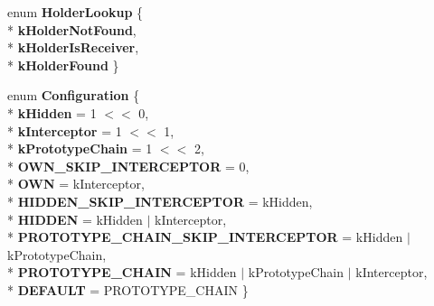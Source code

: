 \begin{DoxyCompactItemize}
\item 
enum {\bfseries Holder\+Lookup} \{ \\*
{\bfseries k\+Holder\+Not\+Found}, 
\\*
{\bfseries k\+Holder\+Is\+Receiver}, 
\\*
{\bfseries k\+Holder\+Found}
 \}\hypertarget{classv8_1_1internal_1_1_b_a_s_e___e_m_b_e_d_d_e_d_a574780580d55298af45d52077d3422fe}{}\label{classv8_1_1internal_1_1_b_a_s_e___e_m_b_e_d_d_e_d_a574780580d55298af45d52077d3422fe}

\item 
enum {\bfseries Configuration} \{ \\*
{\bfseries k\+Hidden} = 1 $<$$<$ 0, 
\\*
{\bfseries k\+Interceptor} = 1 $<$$<$ 1, 
\\*
{\bfseries k\+Prototype\+Chain} = 1 $<$$<$ 2, 
\\*
{\bfseries O\+W\+N\+\_\+\+S\+K\+I\+P\+\_\+\+I\+N\+T\+E\+R\+C\+E\+P\+T\+OR} = 0, 
\\*
{\bfseries O\+WN} = k\+Interceptor, 
\\*
{\bfseries H\+I\+D\+D\+E\+N\+\_\+\+S\+K\+I\+P\+\_\+\+I\+N\+T\+E\+R\+C\+E\+P\+T\+OR} = k\+Hidden, 
\\*
{\bfseries H\+I\+D\+D\+EN} = k\+Hidden $\vert$ k\+Interceptor, 
\\*
{\bfseries P\+R\+O\+T\+O\+T\+Y\+P\+E\+\_\+\+C\+H\+A\+I\+N\+\_\+\+S\+K\+I\+P\+\_\+\+I\+N\+T\+E\+R\+C\+E\+P\+T\+OR} = k\+Hidden $\vert$ k\+Prototype\+Chain, 
\\*
{\bfseries P\+R\+O\+T\+O\+T\+Y\+P\+E\+\_\+\+C\+H\+A\+IN} = k\+Hidden $\vert$ k\+Prototype\+Chain $\vert$ k\+Interceptor, 
\\*
{\bfseries D\+E\+F\+A\+U\+LT} = P\+R\+O\+T\+O\+T\+Y\+P\+E\+\_\+\+C\+H\+A\+IN
 \}\hypertarget{classv8_1_1internal_1_1_b_a_s_e___e_m_b_e_d_d_e_d_ad8a2e468fa3dc4653942cd4be018625a}{}\label{classv8_1_1internal_1_1_b_a_s_e___e_m_b_e_d_d_e_d_ad8a2e468fa3dc4653942cd4be018625a}


\end{DoxyCompactItemize}
